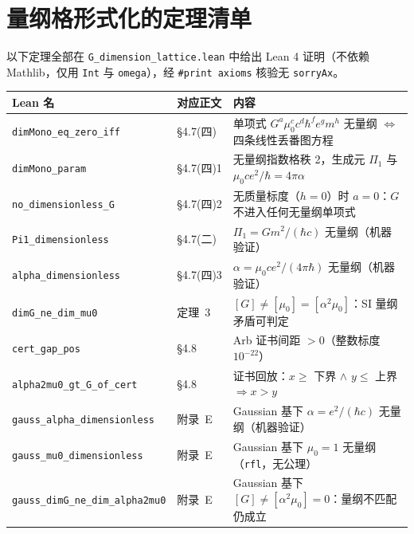 \documentclass[12pt,a4paper]{article}
\begin{document}
\section{量纲格形式化的定理清单}

以下定理全部在 \texttt{G\_\allowbreak{}dimension\_\allowbreak{}lattice.lean} 中给出 Lean 4 证明（不依赖 Mathlib，仅用 \texttt{Int} 与 \texttt{omega}），经 \texttt{\#print axioms} 核验无 \texttt{sorryAx}。

\begin{center}
\footnotesize
\begin{tabular}{@{}llp{7.6cm}@{}}
\toprule
\textbf{Lean 名} & \textbf{对应正文} & \textbf{内容} \\
\midrule
\texttt{dimMono\_\allowbreak{}eq\_\allowbreak{}zero\_\allowbreak{}iff} & §4.7(四) & 单项式 $G^a\mu_0^c c^d\hbar^f e^g m^h$ 无量纲 $\iff$ 四条线性丢番图方程 \\
\texttt{dimMono\_\allowbreak{}param} & §4.7(四)1 & 无量纲指数格秩 2，生成元 $\Pi_1$ 与 $\mu_0ce^2/\hbar=4\pi\alpha$ \\
\texttt{no\_\allowbreak{}dimensionless\_\allowbreak{}G} & §4.7(四)2 & 无质量标度（$h=0$）时 $a=0$：$G$ 不进入任何无量纲单项式 \\
\texttt{Pi1\_\allowbreak{}dimensionless} & §4.7(二) & $\Pi_1 = Gm^2/(\hbar c)$ 无量纲（机器验证） \\
\texttt{alpha\_\allowbreak{}dimensionless} & §4.7(四)3 & $\alpha=\mu_0ce^2/(4\pi\hbar)$ 无量纲（机器验证） \\
\texttt{dimG\_\allowbreak{}ne\_\allowbreak{}dim\_\allowbreak{}mu0} & 定理~3 & $[G]\neq[\mu_0]=[\alpha^2\mu_0]$：SI 量纲矛盾可判定 \\
\texttt{cert\_\allowbreak{}gap\_\allowbreak{}pos} & §4.8 & Arb 证书间距 $>0$（整数标度 $10^{-22}$） \\
\texttt{alpha2mu0\_\allowbreak{}gt\_\allowbreak{}G\_\allowbreak{}of\_\allowbreak{}cert} & §4.8 & 证书回放：$x\ge$ 下界 $\wedge$ $y\le$ 上界 $\Rightarrow x>y$ \\
\texttt{gauss\_\allowbreak{}alpha\_\allowbreak{}dimensionless} & 附录~E & Gaussian 基下 $\alpha=e^2/(\hbar c)$ 无量纲（机器验证） \\
\texttt{gauss\_\allowbreak{}mu0\_\allowbreak{}dimensionless} & 附录~E & Gaussian 基下 $\mu_0=1$ 无量纲（\texttt{rfl}，无公理） \\
\texttt{gauss\_\allowbreak{}dimG\_\allowbreak{}ne\_\allowbreak{}dim\_\allowbreak{}alpha2mu0} & 附录~E & Gaussian 基下 $[G]\neq[\alpha^2\mu_0]=0$：量纲不匹配仍成立 \\

\end{tabular}
\end{center}
\end{document}
